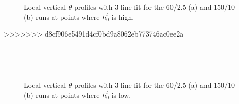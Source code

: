 \begin{figure}[htbp]
\begin{minipage}[b]{0.5\linewidth}
        \\
        \end{minipage}             
\quad
\begin{minipage}[b]{0.5\linewidth}
        \\
       
       \end{minipage}
        \caption{Local vertical $\theta$ profiles with 3-line fit for the 60/2.5 (a) and 150/10 (b) runs at 
points where $h^{l}_{0}$ is high.}
        \label{fig:rssfitshigh}
\end{figure}
>>>>>>> d8cf906e5491d4cf0bd9a8062eb773746ac0ee2a

\begin{figure}[htbp]
\begin{minipage}[b]{0.5\linewidth}
        \\
        \end{minipage}             
\quad
\begin{minipage}[b]{0.5\linewidth}
        \\
       
       \end{minipage}
        \caption{Local vertical $\theta$ profiles with 3-line fit for the 60/2.5 (a) and 150/10 (b) runs at 
points where $h^{l}_{0}$ is low.}
        \label{fig:rssfitslow}
\end{figure}

